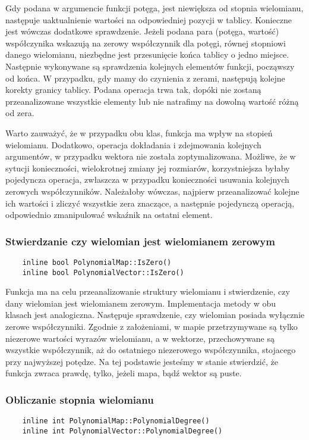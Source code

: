 \documentclass[oneside,a4paper]{book}
\begin{document}
	Gdy podana w argumencie funkcji potęga, jest niewiększa od stopnia wielomianu, następuje uaktualnienie wartości na odpowiedniej pozycji w tablicy. Konieczne jest wówczas dodatkowe sprawdzenie. Jeżeli podana para (potęga, wartość) współczynika wskazują na zerowy współczynnik dla potęgi, równej stopniowi danego wielomianu, niezbędne jest przesunięcie końca tablicy o jedno miejsce. Następnie wykonywane są sprawdzenia kolejnych elementów funkcji, począwszy od końca. W przypadku, gdy mamy do czynienia z zerami, następują kolejne korekty granicy tablicy. Podana operacja trwa tak, dopóki nie zostaną przeanalizowane wszystkie elementy lub nie natrafimy na dowolną wartość różną od zera.
	
	Warto zauważyć, że w przypadku obu klas, funkcja ma wpływ na stopień wielomianu. Dodatkowo, operacja dokładania i zdejmowania kolejnych argumentów, w przypadku wektora nie została zoptymalizowana. Możliwe, że w sytucji konieczności, wielokrotnej zmiany jej rozmiarów, korzystniejsza byłaby pojedyncza operacja, zwłaszcza w przypadku konieczności usuwania kolejnych zerowych współczynników. Należałoby wówczas, najpierw przeanalizować kolejne ich wartości i zliczyć wszystkie zera znaczące, a następnie pojedynczą operacją, odpowiednio zmanipulować wskaźnik na ostatni element.
	
	\subsubsection{Stwierdzanie czy wielomian jest wielomianem zerowym}
	\begin{lstlisting}
	inline bool PolynomialMap::IsZero()
	inline bool PolynomialVector::IsZero()
	\end{lstlisting}
	
	Funkcja ma na celu przeanalizowanie struktury wielomianu i stwierdzenie, czy dany wielomian jest wielomianem zerowym. Implementacja metody w obu klasach jest analogiczna. Następuje sprawdzenie, czy wielomian posiada wyłącznie zerowe współczynniki. Zgodnie z założeniami, w mapie przetrzymywane są tylko niezerowe wartości wyrazów wielomianu, a w wektorze, przechowywane są wszystkie współczynnik, aż do ostatniego niezerowego współczynnika, stojacego przy najwyższej potędze. Na tej podstawie jesteśmy w stanie stwierdzić, że funkcja zwraca prawdę, tylko, jeżeli mapa, bądź wektor są puste.
	
	\subsubsection{Obliczanie stopnia wielomianu}
	\begin{lstlisting}
	inline int PolynomialMap::PolynomialDegree()
	inline int PolynomialVector::PolynomialDegree()
	\end{lstlisting}
	
\end{document}

